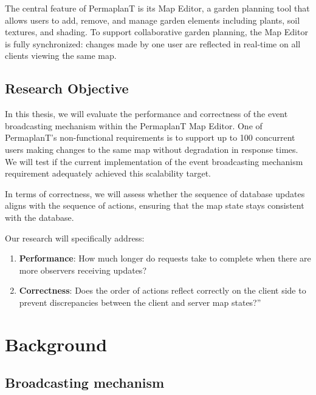 \documentclass[final,draft]{vutinfth} %
\begin{document}
The central feature of PermaplanT is its Map Editor, a garden planning tool that allows users to add, remove, and manage garden elements including plants, soil textures, and shading.
To support collaborative garden planning, the Map Editor is fully synchronized: changes made by one user are reflected in real-time on all clients viewing the same map.

\section{Research Objective}

In this thesis, we will evaluate the performance and correctness of the event broadcasting mechanism within the PermaplanT Map Editor.
One of PermaplanT's non-functional requirements is to support up to 100 concurrent users making changes to the same map without degradation in response times.
We will test if the current implementation of the event broadcasting mechanism requirement adequately achieved this scalability target.

In terms of correctness, we will assess whether the sequence of database updates aligns with the sequence of actions, ensuring that the map state stays consistent with the database.

Our research will specifically address:
\begin{enumerate}
  \item \textbf{Performance}: How much longer do requests take to complete when there are more observers receiving updates?
  \item \textbf{Correctness}: Does the order of actions reflect correctly on the client side to prevent discrepancies between the client and server map states?”
\end{enumerate}

\chapter{Background}

\section{Broadcasting mechanism}
\end{document}
